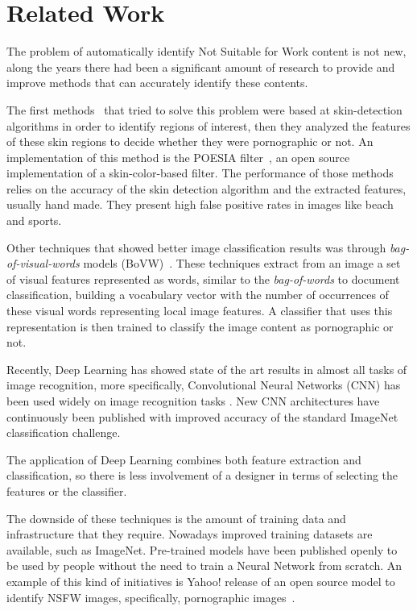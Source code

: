 \chapter{Related Work}

The problem of automatically identify Not Suitable for Work content is not new, along the years there had been a significant amount of research to provide and improve methods that can accurately identify these contents.

The first methods~\cite{Zheng2004} that tried to solve this problem were based at skin-detection algorithms in order to identify regions of interest, then they analyzed the features of these skin regions to decide whether they were pornographic or not. An implementation of this method is the POESIA filter~\cite{poesia}, an open source implementation of a skin-color-based filter. The performance of those methods relies on the accuracy of the skin detection algorithm and the extracted features, usually hand made. They present high false positive rates in images like beach and sports.

Other techniques that showed better image classification results was through \emph{bag-of-visual-words} models (BoVW)~\cite{4761366}. These techniques extract from an image a set of visual features represented as words, similar to the \emph{bag-of-words} to document classification, building a vocabulary vector with the number of occurrences of these visual words representing local image features.  A classifier that uses this representation is then trained to classify the image content as pornographic or not.

Recently, Deep Learning has showed state of the art results in almost all tasks of image recognition, more specifically, Convolutional Neural Networks (CNN) has been used widely on image recognition tasks \cite{Krizhevsky2012}. New CNN architectures have continuously been published with improved accuracy of the standard ImageNet~\cite{imagenet} classification challenge. 


The application of Deep Learning combines both feature extraction and classification, so there is less involvement of a designer in terms of selecting the features or the classifier.

The downside of these techniques is the amount of training data and infrastructure that they require. Nowadays improved training datasets are available, such as ImageNet. Pre-trained models have been published openly to be used by people without the need to train a Neural Network from scratch.
An example of this kind of initiatives is Yahoo! release of an open source model to identify NSFW images, specifically, pornographic images~\cite{opennsfw}.


